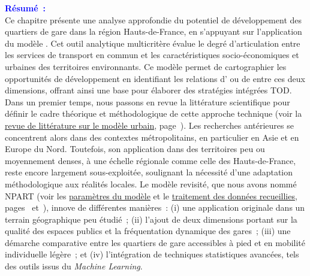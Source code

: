 \begin{refsegment}
    \newpage
    \begin{tcolorbox}[colback=white!5!white,
                      colframe=blue!75!blue,
                      title=
                      \bigskip
                      \center{\textbf{Préambule du chapitre~6}}
                      \\
                      \raggedright{\small{Chapitre composé de \pagedifference{chap6:titre}{part3:conclusion} pages, dont \pagedifference{chap6:bibliographie}{part3:conclusion} pages de bibliographie}}
                      \bigskip]
\Large{\textcolor{blue}{\textbf{Résumé~:}}}
    \\
    \small{
Ce chapitre présente une analyse approfondie du potentiel de développement des quartiers de gare dans la région Hauts-de-France, en s'appuyant sur l'application du modèle . Cet outil analytique multicritère évalue le degré d'articulation entre les services de transport en commun et les caractéristiques socio-économiques et urbaines des territoires environnants. Ce modèle permet de cartographier les opportunités de développement en identifiant les relations d' ou de  entre ces deux dimensions, offrant ainsi une base pour élaborer des stratégies intégrées \acrfull{TOD}.%
    \\
Dans un premier temps, nous passons en revue la littérature scientifique pour définir le cadre théorique et méthodologique de cette approche technique (voir la \hyperref[chap6:revue-litterature-m-tod-index]{revue de littérature sur le modèle urbain}, page~\pageref{chap6:revue-litterature-m-tod-index}). Les recherches antérieures se concentrent alors dans des contextes métropolitains, en particulier en Asie et en Europe du Nord. Toutefois, son application dans des territoires peu ou moyennement denses, à une échelle régionale comme celle des Hauts-de-France, reste encore largement sous-exploitée, soulignant la nécessité d'une adaptation méthodologique aux réalités locales. Le modèle revisité, que nous avons nommé \acrfull{NPART} (voir les \hyperref[chap6:selection-indicateurs]{paramètres du modèle} et le \hyperref[chap6:methodologie-m-tod-index]{traitement des données recueillies}, pages~\pageref{chap6:selection-indicateurs} et~\pageref{chap6:methodologie-m-tod-index}), innove de différentes manières~: (i) une application originale dans un terrain géographique peu étudié~; (ii) l'ajout de deux dimensions portant sur la qualité des espaces publics et la fréquentation dynamique des gares~; (iii) une démarche comparative entre les quartiers de gare accessibles à pied et en mobilité individuelle légère~; et (iv) l'intégration de techniques statistiques avancées, tels des outils issus du \textsl{Machine Learning}.%
}
\end{tcolorbox}
\end{refsegment}
